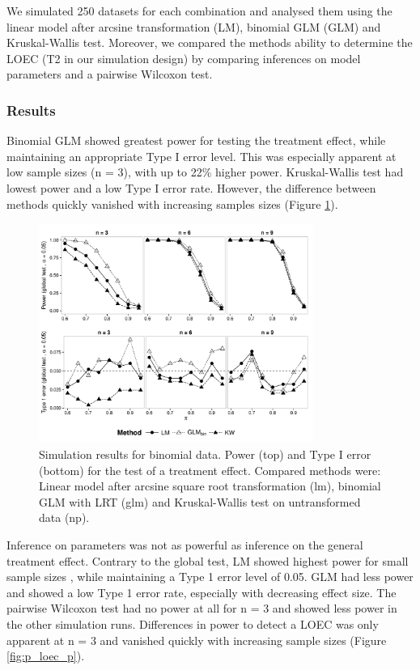 \documentclass{scrartcl}
\begin{document}
We simulated 250 datasets for each combination and analysed them using the linear model after arcsine transformation (LM), binomial GLM (GLM) and Kruskal-Wallis test.
Moreover, we compared the methods ability to determine the LOEC (T2 in our simulation design) by comparing inferences on model parameters and a pairwise Wilcoxon test. 


\subsubsection{Results}
Binomial GLM showed greatest power for testing the treatment effect, while maintaining an appropriate Type I error level.
This was especially apparent at low sample sizes (n = 3), with up to 22\% higher power.
Kruskal-Wallis test had lowest power and a low Type I error rate.
However, the difference between methods quickly vanished with increasing samples sizes (Figure \ref{fig:p_glob_p}).

\begin{figure}[h]
  \centering
  \includegraphics[width = 0.8\textwidth]{p_glob_p.pdf}
  \caption{Simulation results for binomial data. Power (top) and Type I error (bottom) for the test of a treatment effect. Compared methods were: Linear model after arcsine square root transformation (lm), binomial GLM with LRT (glm) and Kruskal-Wallis test on untransformed data (np).}
  \label{fig:p_glob_p}
\end{figure}

Inference on parameters was not as powerful as inference on the general treatment effect.
Contrary to the global test, LM showed highest power for small sample sizes , while maintaining a Type 1 error level of 0.05.
GLM had less power and showed a low Type 1 error rate, especially with decreasing effect size.
The pairwise Wilcoxon test had no power at all for n = 3 and showed less power in the other simulation runs.
Differences in power to detect a LOEC was only apparent at n = 3 and vanished quickly with increasing sample sizes (Figure \ref{fig:p_loec_p}). 
\end{document}
